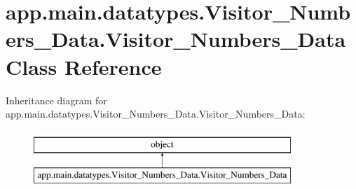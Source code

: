 \hypertarget{classapp_1_1main_1_1datatypes_1_1Visitor__Numbers__Data_1_1Visitor__Numbers__Data}{}\section{app.\+main.\+datatypes.\+Visitor\+\_\+\+Numbers\+\_\+\+Data.\+Visitor\+\_\+\+Numbers\+\_\+\+Data Class Reference}
\label{classapp_1_1main_1_1datatypes_1_1Visitor__Numbers__Data_1_1Visitor__Numbers__Data}
Inheritance diagram for app.\+main.\+datatypes.\+Visitor\+\_\+\+Numbers\+\_\+\+Data.\+Visitor\+\_\+\+Numbers\+\_\+\+Data\+:\begin{figure}[H]
\begin{center}
\leavevmode
\includegraphics[height=2.000000cm]{classapp_1_1main_1_1datatypes_1_1Visitor__Numbers__Data_1_1Visitor__Numbers__Data}
\end{center}
\end{figure}
